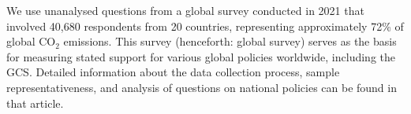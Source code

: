 

We use unanalysed questions from a global survey conducted in 2021 that involved 40,680 respondents from 20 countries, representing approximately 72\% of global CO$_\text{2}$ emissions. 
This survey (henceforth: global survey) serves as the basis for measuring stated support for various global policies worldwide, including the GCS. 
Detailed information about the data collection process, sample representativeness, and analysis of questions on national policies can be found in that article.\cite{dechezlepretre_fighting_nodate}

